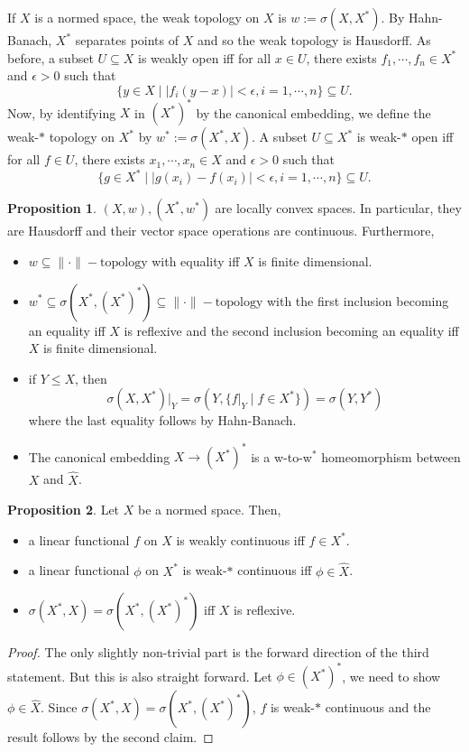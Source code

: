 \documentclass[]{article}
\theoremstyle{definition}
\newtheorem{proposition}{Proposition}[section]
\begin{document}
If \(X\) is a normed space, the weak topology on \(X\) is \(w := \sigma(X, X^*)\). By Hahn-Banach, \(X^*\) 
separates points of \(X\) and so the weak topology is Hausdorff. As before, a subset \(U \subseteq X\) 
is weakly open iff for all \(x \in U\), there exists \(f_1, \cdots, f_n \in X^*\) and \(\epsilon > 0\) 
such that
\[\{y \in X \mid |f_i(y - x)| < \epsilon, i = 1, \cdots, n\} \subseteq U.\]
Now, by identifying \(X\) in \((X^*)^*\) by the canonical embedding, we define the weak-\(*\) topology 
on \(X^*\) by \(w^* := \sigma(X^*, X)\). A subset \(U \subseteq X^*\) is weak-\(*\) open iff for all
\(f \in U\), there exists \(x_1, \cdots, x_n \in X\) and \(\epsilon > 0\) such that
\[\{g \in X^* \mid |g(x_i) - f(x_i)| < \epsilon, i = 1, \cdots, n\} \subseteq U.\]

\begin{proposition}
  \((X, w), (X^*, w^*)\) are locally convex spaces. In particular, they are Hausdorff and their 
  vector space operations are continuous. Furthermore, 
  \begin{itemize}
    \item \(w \subseteq \|\cdot\|-\text{topology}\) with equality iff \(X\) is finite dimensional.
    \item \(w^* \subseteq \sigma(X^*, (X^*)^*) \subseteq \|\cdot\|-\text{topology}\) with the first 
      inclusion becoming an equality iff \(X\) is reflexive and the second inclusion becoming an
      equality iff \(X\) is finite dimensional.
    \item if \(Y \le X\), then 
      \[\sigma(X, X^*)|_Y = \sigma(Y, \{f|_Y \mid f \in X^*\}) = \sigma(Y, Y^*)\]
      where the last equality follows by Hahn-Banach.
    \item The canonical embedding \(X \to (X^*)^*\) is a w-to-w\(^*\) homeomorphism between \(X\) 
      and \(\hat X\).
  \end{itemize}
\end{proposition}

\begin{proposition}
  Let \(X\) be a normed space. Then,
  \begin{itemize}
    \item a linear functional \(f\) on \(X\) is weakly continuous iff \(f \in X^*\).
    \item a linear functional \(\phi\) on \(X^*\) is weak-\(*\) continuous iff \(\phi \in \hat X\).
    \item \(\sigma(X^*, X) = \sigma(X^*, (X^*)^*)\) iff \(X\) is reflexive.
  \end{itemize}
\end{proposition}
\begin{proof}
  The only slightly non-trivial part is the forward direction of the third statement. But this is 
  also straight forward. Let \(\phi \in (X^*)^*\), we need to show \(\phi \in \hat X\). 
  Since \(\sigma(X^*, X) = \sigma(X^*, (X^*)^*)\), \(f\) is weak-\(*\) continuous and the result follows 
  by the second claim.
\end{proof}
\end{document}
